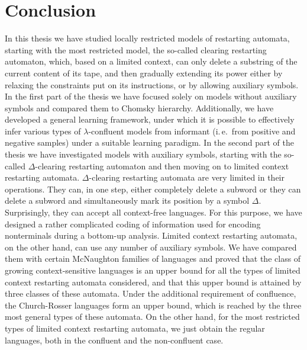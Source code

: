 \chapter*{Conclusion}\label{chapter:conclusion}

In this thesis we have studied locally restricted models of restarting automata, starting with the most restricted model, the so-called clearing restarting automaton, which, based on a limited context, can only delete a substring of the current content of its tape, and then gradually extending its power either by relaxing the constraints put on its instructions, or by allowing auxiliary symbols. In the first part of the thesis we have focused solely on models without auxiliary symbols and compared them to Chomsky hierarchy. Additionally, we have developed a general learning framework, under which it is possible to effectively infer various types of $\lambda$-confluent models from informant (i.\,e.\ from positive and negative samples) under a suitable learning paradigm. In the second part of the thesis we have investigated models with auxiliary symbols, starting with the so-called $\Delta$-clearing restarting automaton and then moving on to limited context restarting automata. $\Delta$-clearing restarting automata are very limited in their operations. They can, in one step, either completely delete a subword or they can delete a subword and simultaneously mark its position by a symbol $\Delta$. Surprisingly, they can accept all context-free languages. For this purpose, we have designed a rather complicated coding of information used for encoding nonterminals during a bottom-up analysis. Limited context restarting automata, on the other hand, can use any number of auxiliary symbols. We have compared them with certain McNaughton families of languages and proved that the class of growing context-sensitive languages is an upper bound for all the types of limited context restarting automata considered, and that this upper bound is attained by three classes of these automata. Under the additional requirement of confluence, the Church-Rosser languages form an upper bound, which is reached by the three most general types of these automata. On the other hand, for the most restricted types of limited context restarting automata, we just obtain the regular languages, both in the confluent and the non-confluent case.